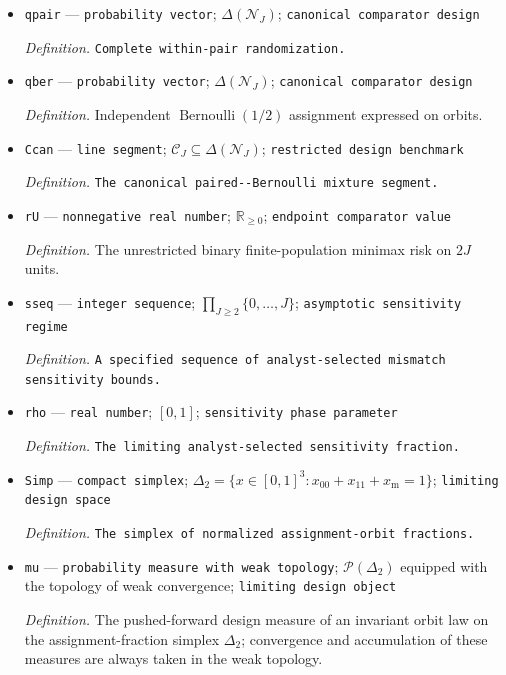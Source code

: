 \documentclass{article}
\begin{document}
\begin{itemize}
  \item \texttt{qpair} --- \texttt{probability vector}; \(\Delta(\mathcal N_J)\); \texttt{canonical comparator design}
  \par\smallskip\noindent\emph{Definition.} \texttt{Complete within-\allowbreak{}pair randomization.}
  \item \texttt{qber} --- \texttt{probability vector}; \(\Delta(\mathcal N_J)\); \texttt{canonical comparator design}
  \par\smallskip\noindent\emph{Definition.} Independent \(\operatorname{Bernoulli}(1/2)\) assignment expressed on orbits.
  \item \texttt{Ccan} --- \texttt{line segment}; \(\mathcal C_J\subseteq\Delta(\mathcal N_J)\); \texttt{restricted design benchmark}
  \par\smallskip\noindent\emph{Definition.} \texttt{The canonical paired-\allowbreak{}-\allowbreak{}Bernoulli mixture segment.}
  \item \texttt{rU} --- \texttt{nonnegative real number}; \(\mathbb R_{\ge0}\); \texttt{endpoint comparator value}
  \par\smallskip\noindent\emph{Definition.} The unrestricted binary finite-population minimax risk on \(2J\) units.
  \item \texttt{sseq} --- \texttt{integer sequence}; \(\prod_{J\ge2}\{0,\ldots,J\}\); \texttt{asymptotic sensitivity regime}
  \par\smallskip\noindent\emph{Definition.} \texttt{A specified sequence of analyst-\allowbreak{}selected mismatch sensitivity bounds.}
  \item \texttt{rho} --- \texttt{real number}; \([0,1]\); \texttt{sensitivity phase parameter}
  \par\smallskip\noindent\emph{Definition.} \texttt{The limiting analyst-\allowbreak{}selected sensitivity fraction.}
  \item \texttt{Simp} --- \texttt{compact simplex}; \(\Delta_2=\{x\in[0,1]^3:x_{00}+x_{11}+x_{\mathrm m}=1\}\); \texttt{limiting design space}
  \par\smallskip\noindent\emph{Definition.} \texttt{The simplex of normalized assignment-\allowbreak{}orbit fractions.}
  \item \texttt{mu} --- \texttt{probability measure with weak topology}; \(\mathcal P(\Delta_2)\) equipped with the topology of weak convergence; \texttt{limiting design object}
  \par\smallskip\noindent\emph{Definition.} The pushed-forward design measure of an invariant orbit law on the assignment-fraction simplex \(\Delta_2\); convergence and accumulation of these measures are always taken in the weak topology.

\end{itemize}
\end{document}
